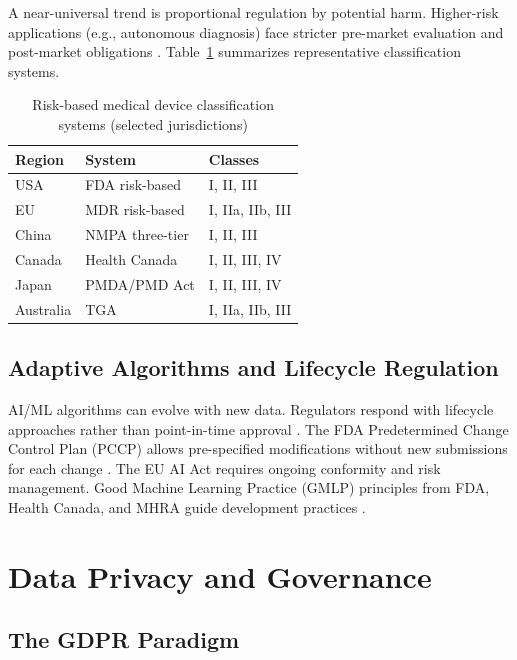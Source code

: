 \documentclass[12pt,a4paper]{report}
\begin{document}
A near-universal trend is proportional regulation by potential harm. Higher-risk applications (e.g., autonomous diagnosis) face stricter pre-market evaluation and post-market obligations \cite{muehlematter2021}. Table~\ref{tab:risk-systems} summarizes representative classification systems.

\begin{table}[htbp]
  \centering
  \caption{Risk-based medical device classification systems (selected jurisdictions)}
  \label{tab:risk-systems}
  \begin{tabular}{@{}lll@{}}
    \toprule
    \textbf{Region} & \textbf{System} & \textbf{Classes} \\
    \midrule
    USA & FDA risk-based & I, II, III \\
    EU & MDR risk-based & I, IIa, IIb, III \\
    China & NMPA three-tier & I, II, III \\
    Canada & Health Canada & I, II, III, IV \\
    Japan & PMDA/PMD Act & I, II, III, IV \\
  Australia & TGA & I, IIa, IIb, III \\
    \bottomrule
  \end{tabular}
\end{table}

\subsection{Adaptive Algorithms and Lifecycle Regulation}

AI/ML algorithms can evolve with new data. Regulators respond with lifecycle approaches rather than point-in-time approval \cite{babic2019,hwang2019}. The FDA Predetermined Change Control Plan (PCCP) allows pre-specified modifications without new submissions for each change \cite{fda2023}. The EU AI Act requires ongoing conformity and risk management. Good Machine Learning Practice (GMLP) principles from FDA, Health Canada, and MHRA guide development practices \cite{gmlp2021}.

\section{Data Privacy and Governance}

\subsection{The GDPR Paradigm}
\end{document}

